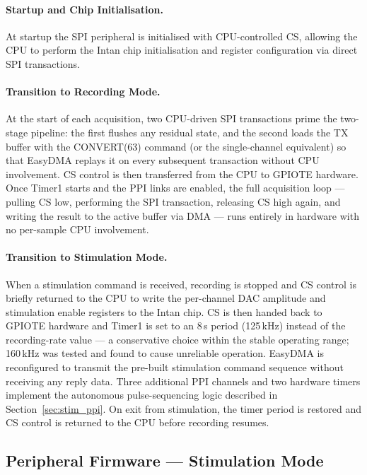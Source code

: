 \paragraph{Startup and Chip Initialisation.}
At startup the SPI peripheral is initialised with CPU-controlled CS, allowing
the CPU to perform the Intan chip initialisation and register configuration via
direct SPI transactions.

\paragraph{Transition to Recording Mode.}
At the start of each acquisition, two CPU-driven SPI transactions prime the
two-stage pipeline: the first flushes any residual state, and the second loads the
TX buffer with the CONVERT(63) command (or the single-channel equivalent) so that
EasyDMA replays it on every subsequent transaction without CPU involvement. CS
control is then transferred from the CPU to GPIOTE hardware. Once Timer1 starts
and the PPI links are enabled, the full acquisition loop --- pulling CS low,
performing the SPI transaction, releasing CS high again, and writing the result to
the active buffer via DMA --- runs entirely in hardware with no per-sample CPU
involvement.

\paragraph{Transition to Stimulation Mode.}
When a stimulation command is received, recording is stopped and CS control is
briefly returned to the CPU to write the per-channel DAC amplitude and
stimulation enable registers to the Intan chip. CS is then handed back to GPIOTE
hardware and Timer1 is set to an 8\,\textmu{}s period (125\,kHz) instead of the
recording-rate value --- a conservative choice within the stable operating range;
160\,kHz was tested and found to cause unreliable operation. EasyDMA is
reconfigured to transmit the pre-built
stimulation command sequence without receiving any reply data. Three additional
PPI channels and two hardware timers implement the autonomous pulse-sequencing
logic described in Section~\ref{sec:stim_ppi}. On exit from stimulation, the
timer period is restored and CS control is returned to the CPU before recording
resumes.


\subsection{Peripheral Firmware --- Stimulation Mode}

